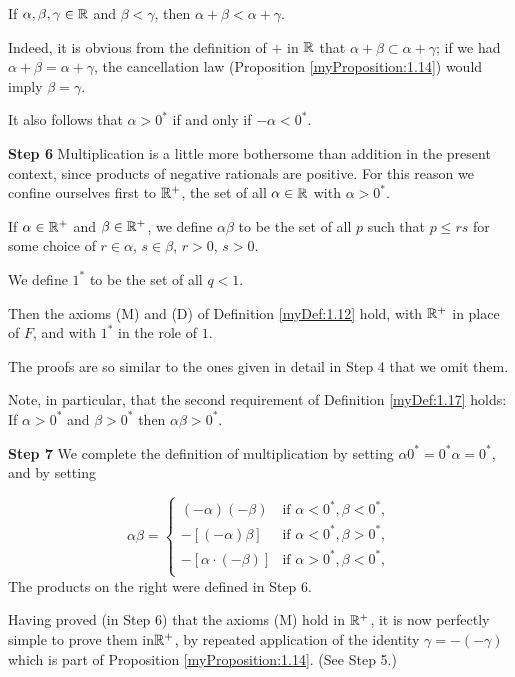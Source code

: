 If $\alpha, \beta, \gamma \in {\protect\mathbb R}$ and $\beta < \gamma$, then $\alpha + \beta < \alpha + \gamma$.

Indeed, it is obvious from the definition of $+$ in ${\protect\mathbb R}$ that $\alpha + \beta \subset \alpha + \gamma$; if we had $\alpha + \beta = \alpha + \gamma$, the cancellation law (Proposition \ref{myProposition:1.14}) would imply $\beta = \gamma$.

It also follows that $\alpha > 0^*$ if and only if $-\alpha < 0^*$.

\textbf{Step 6} Multiplication is a little more bothersome than addition in the present context, since products of negative rationals are positive. For this reason we confine ourselves first to ${\protect\mathbb R}^+$, the set of all $\alpha \in {\protect\mathbb R}$ with $\alpha > 0^*$.

If $\alpha \in {\protect\mathbb R}^+$ and $\beta \in {\protect\mathbb R}^+$, we define $\alpha\beta$ to be the set of all $p$ such that $p \leq rs$
for some choice of $r \in \alpha$, $s \in \beta$, $r>0$, $s>0$.

We define $1^*$ to be the set of all $q < 1$.


Then the axioms (M) and (D) of Definition \ref{myDef:1.12} hold, with ${\protect\mathbb R}^+$ in place of $F$, and with $1^*$ in the role of $1$.

The proofs are so similar to the ones given in detail in Step 4 that we omit
them.

Note, in particular, that the second requirement of Definition \ref{myDef:1.17} holds:
If $\alpha > 0^*$ and $\beta > 0^*$ then $\alpha\beta > 0^*$.

\textbf{Step 7} We complete the definition of multiplication by setting $\alpha 0^* = 0^* \alpha = 0^*$,
and by setting

\begin{equation*}
    \alpha\beta = \left\{
        \begin{array}{ll}
            (-\alpha)(-\beta) & \text{if } \alpha < 0^*, \beta < 0^*,\\
            -[(-\alpha)\beta] & \text{if } \alpha < 0^*, \beta > 0^*,\\
            -[\alpha\cdot(-\beta)] & \text{if } \alpha > 0^*, \beta < 0^*,\\
        \end{array}
    \right.
\end{equation*}
The products on the right were defined in Step 6.

Having proved (in Step 6) that the axioms (M) hold in ${\protect\mathbb R}^+$, it is now
perfectly simple to prove them in${\protect\mathbb R}^+$, by repeated application of the identity $\gamma = -(-\gamma)$ which is part of Proposition \ref{myProposition:1.14}. (See Step 5.)

